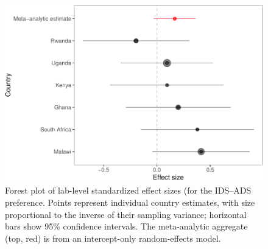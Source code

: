 \documentclass[
  ,man,floatsintext]{apa6}
\begin{document}
\begin{figure}
\centering
\includegraphics{mb1a-paper_files/figure-latex/unnamed-chunk-33-1.pdf}
\caption{\label{fig:unnamed-chunk-33}Forest plot of lab-level standardized effect sizes (for the IDS--ADS preference. Points represent individual country estimates, with size proportional to the inverse of their sampling variance; horizontal bars show 95\% confidence intervals. The meta-analytic aggregate (top, red) is from an intercept-only random-effects model.}
\end{figure}
\end{document}
